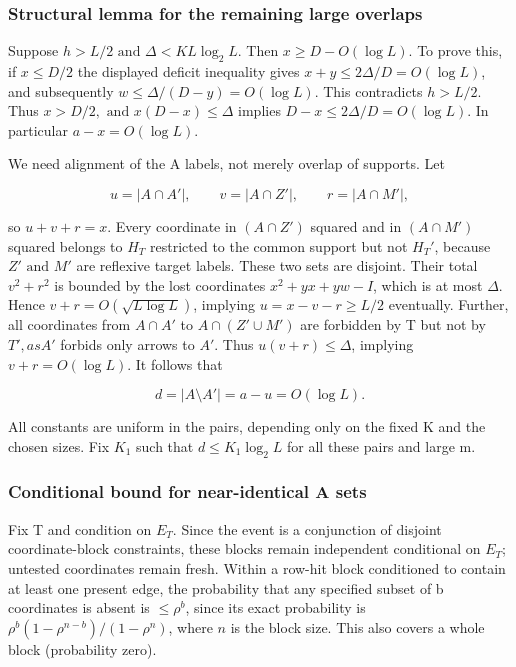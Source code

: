 \documentclass[11pt]{article}
\begin{document}
\subsubsection{Structural lemma for the remaining large overlaps}

Suppose $h>L/2 \text{ and } \Delta <K L \log _{2} L$. Then $x\geq D-O(\log  L)$. To prove this, if $x\leq D/2$ the displayed deficit inequality gives $x+y\leq 2 \Delta /D=O(\log  L)$, and subsequently $w\leq \Delta /(D-y)=O(\log  L)$. This contradicts $h>L/2$. Thus $x>D/2, \text{ and } x(D-x)\leq \Delta $ implies $D-x\leq 2 \Delta /D=O(\log  L)$. In particular $a-x=O(\log  L)$.

We need alignment of the A labels, not merely overlap of supports. Let

\[
u=|A\cap A'|,\qquad v=|A\cap Z'|,\qquad r=|A\cap M'|,
\]

so $u+v+r=x$. Every coordinate in $(A \cap  Z')$ squared and in $(A \cap  M')$ squared belongs to $H_{T}$ restricted to the common support but not $H_{T}'$, because $Z' \text{ and } M'$ are reflexive target labels. These two sets are disjoint. Their total $v^{2}+r^{2}$ is bounded by the lost coordinates $x^{2}+yx+yw-I$, which is at most $\Delta $. Hence $v+r=O(\sqrt{L \log  L})$, implying $u=x-v-r\geq L/2$ eventually. Further, all coordinates from $A \cap  A'$ to $A \cap  (Z' \cup  M')$ are forbidden by T but not by $T', as A'$ forbids only arrows to $A'$. Thus $u(v+r)\leq \Delta $, implying $v+r=O(\log  L)$. It follows that

\[
d=|A\setminus A'|=a-u=O(\log L).
\]

All constants are uniform in the pairs, depending only on the fixed K and the chosen sizes. Fix $K_{1}$ such that $d\leq K_{1} \log _{2} L$ for all these pairs and large m.

\subsubsection{Conditional bound for near-identical A sets}

Fix T and condition on $E_{T}$. Since the event is a conjunction of disjoint coordinate-block constraints, these blocks remain independent conditional on $E_{T}$; untested coordinates remain fresh. Within a row-hit block conditioned to contain at least one present edge, the probability that any specified subset of b coordinates is absent is $\leq \rho ^{b}$, since its exact probability is $\rho^b(1-\rho^{n-b})/(1-\rho^n)$, where $n$ is the block size. This also covers a whole block (probability zero).
\end{document}
